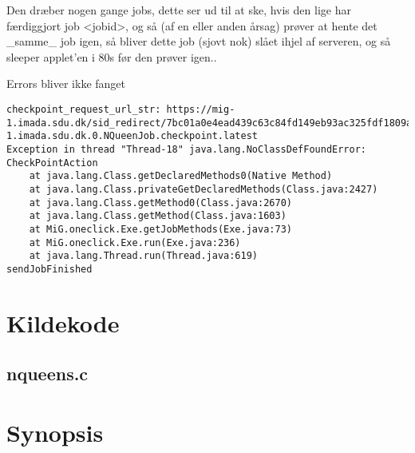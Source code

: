\documentclass[final,a4paper,10pt]{article}
\begin{document}
Den dræber nogen gange jobs, dette ser ud til at ske, hvis den lige har
færdiggjort job <jobid>, og så (af en eller anden årsag) prøver at hente det
\_samme\_ job igen, så bliver dette job (sjovt nok) slået ihjel af serveren, og
så sleeper applet'en i 80s før den prøver igen.. 

Errors bliver ikke fanget
\begin{verbatim}
checkpoint_request_url_str: https://mig-1.imada.sdu.dk/sid_redirect/7bc01a0e4ead439c63c84fd149eb93ac325fdf1809aedc23049c010890bf14bd/13768_6_2_2007__8_42_57_mig-1.imada.sdu.dk.0.NQueenJob.checkpoint.latest
Exception in thread "Thread-18" java.lang.NoClassDefFoundError: CheckPointAction
	at java.lang.Class.getDeclaredMethods0(Native Method)
	at java.lang.Class.privateGetDeclaredMethods(Class.java:2427)
	at java.lang.Class.getMethod0(Class.java:2670)
	at java.lang.Class.getMethod(Class.java:1603)
	at MiG.oneclick.Exe.getJobMethods(Exe.java:73)
	at MiG.oneclick.Exe.run(Exe.java:236)
	at java.lang.Thread.run(Thread.java:619)
sendJobFinished
\end{verbatim}

%




\appendix


\section{Kildekode}
\subsection{nqueens.c}\label{ckode}
%

\section{Synopsis}
%


%
%
\end{document}
